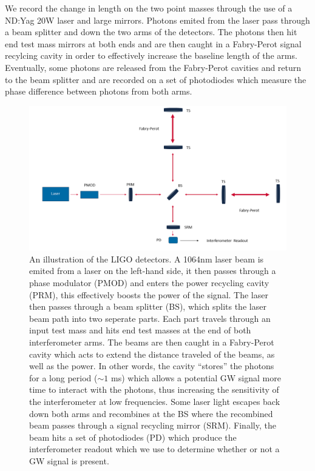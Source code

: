 We record the change in length 
on the two point masses through the use of a ND:Yag 20W 
laser and large mirrors. Photons emited from the laser pass through a beam 
splitter and down the two arms of the detectors. The 
photons then hit end test mass mirrors at both ends 
and are then caught in a Fabry-Perot signal recylcing 
cavity in order to effectively increase the baseline 
length of the arms. Eventually, some photons are released 
from the Fabry-Perot cavities and return to the beam splitter 
and are recorded on a set of photodiodes which measure 
the phase difference between photons from both 
arms.

\begin{figure}
    \centering
    \includegraphics[width=\linewidth]{figures/Interferometer_sketch_figure.png}
    \caption{An illustration of the \ac{LIGO} detectors. A 1064nm laser beam is emited from a laser on the left-hand side, it then passes through a phase modulator (PMOD) and enters the power recycling cavity (PRM), this effectively boosts the power of the signal. The laser then passes through a beam splitter (BS), which splits the laser beam path into two seperate parts. Each part travels through an input test mass and hits end test masses at the end of both interferometer arms. The beams are then caught in a Fabry-Perot cavity which acts to extend the distance traveled of the beams, as well as the power. In other words, the cavity ``stores'' the photons for a long period ($\sim1$ ms) which allows a potential \ac{GW} signal more time to interact with the photons, thus increasing the sensitivity of the interferometer at low frequencies. Some laser light escapes back down both arms and recombines at the BS where the recombined beam passes through a signal recycling mirror (SRM). Finally, the beam hits a set of photodiodes (PD) which produce the interferometer readout which we use to determine whether or not a \ac{GW} signal is present.}
    \label{fig:gw_plus_cross}
\end{figure}


